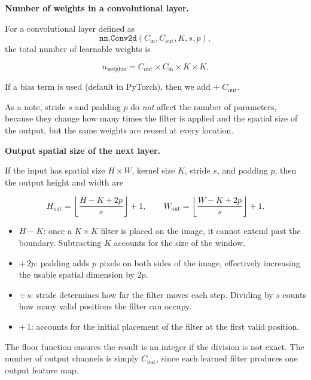 \medskip

\textbf{Number of weights in a convolutional layer.}

For a convolutional layer defined as
\[
\texttt{nn.Conv2d}(C_{\text{in}}, C_{\text{out}}, K, s, p),
\]
the total number of learnable weights is

\[
n_{\text{weights}}
=
C_{\text{out}}
\times
C_{\text{in}}
\times
K
\times
K.
\]

If a bias term is used (default in PyTorch), then we add $+ \; C_{\text{out}}$.

\medskip

As a note, stride $s$ and padding $p$ do \textit{not} affect the number of parameters, because they change how many times the filter is applied and the spatial size of the output, but the same weights are reused at every location.

\bigskip

\textbf{Output spatial size of the next layer.}

If the input has spatial size $H \times W$, kernel size $K$, stride $s$, and padding $p$, then the output height and width are

\[
H_{\text{out}}
=
\left\lfloor
\frac{H - K + 2p}{s}
\right\rfloor
+ 1,
\qquad
W_{\text{out}}
=
\left\lfloor
\frac{W - K + 2p}{s}
\right\rfloor
+ 1.
\]

\begin{itemize}[label=$\circ$, itemsep=0.3em]
\item $H - K$: once a $K \times K$ filter is placed on the image, it cannot extend past the boundary. Subtracting $K$ accounts for the size of the window.

\item $+\,2p$: padding adds $p$ pixels on both sides of the image, effectively increasing the usable spatial dimension by $2p$.

\item $\div\, s$: stride determines how far the filter moves each step. Dividing by $s$ counts how many valid positions the filter can occupy.

\item $+\,1$: accounts for the initial placement of the filter at the first valid position.
\end{itemize}

The floor function ensures the result is an integer if the division is not exact.  
The number of output channels is simply $C_{\text{out}}$, since each learned filter produces one output feature map.  

